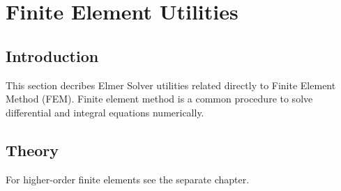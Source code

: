 \chapter{Finite Element Utilities}
\noindent

\section{Introduction}

This section decribes Elmer Solver utilities related directly to Finite Element Method (FEM).
Finite element method is a common procedure to solve differential and integral equations numerically.


\section{Theory}


For higher-order finite elements see the separate chapter.
